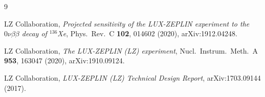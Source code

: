 \documentclass[11pt,a4paper]{article}
\begin{document}
\begin{thebibliography}{9}

LZ Collaboration,
\emph{Projected sensitivity of the LUX-ZEPLIN experiment to the
$0\nu\beta\beta$ decay of $^{136}$Xe},
Phys.~Rev.~C \textbf{102}, 014602 (2020),
arXiv:1912.04248.

LZ Collaboration,
\emph{The LUX-ZEPLIN (LZ) experiment},
Nucl.~Instrum.~Meth.~A \textbf{953}, 163047 (2020),
arXiv:1910.09124.

LZ Collaboration,
\emph{LUX-ZEPLIN (LZ) Technical Design Report},
arXiv:1703.09144 (2017).

\end{thebibliography}
\end{document}
